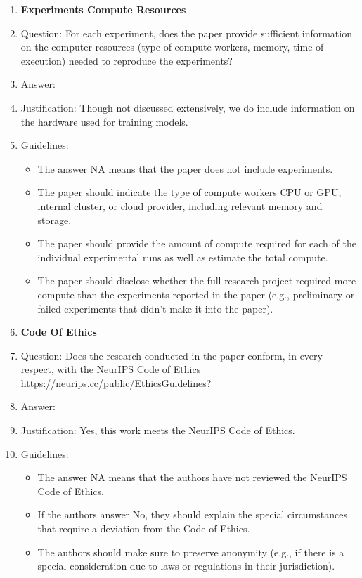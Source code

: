 \documentclass{article}
\begin{document}
\begin{enumerate}
\item {\bf Experiments Compute Resources}
    \item[] Question: For each experiment, does the paper provide sufficient information on the computer resources (type of compute workers, memory, time of execution) needed to reproduce the experiments?
    \item[] Answer: \answerYes{} %
    \item[] Justification: Though not discussed extensively, we do include information on the hardware used for training models.
    \item[] Guidelines:
    \begin{itemize}
        \item The answer NA means that the paper does not include experiments.
        \item The paper should indicate the type of compute workers CPU or GPU, internal cluster, or cloud provider, including relevant memory and storage.
        \item The paper should provide the amount of compute required for each of the individual experimental runs as well as estimate the total compute. 
        \item The paper should disclose whether the full research project required more compute than the experiments reported in the paper (e.g., preliminary or failed experiments that didn't make it into the paper). 
    \end{itemize}
    
\item {\bf Code Of Ethics}
    \item[] Question: Does the research conducted in the paper conform, in every respect, with the NeurIPS Code of Ethics \url{https://neurips.cc/public/EthicsGuidelines}?
    \item[] Answer: \answerYes{} %
    \item[] Justification: Yes, this work meets the NeurIPS Code of Ethics.
    \item[] Guidelines:
    \begin{itemize}
        \item The answer NA means that the authors have not reviewed the NeurIPS Code of Ethics.
        \item If the authors answer No, they should explain the special circumstances that require a deviation from the Code of Ethics.
        \item The authors should make sure to preserve anonymity (e.g., if there is a special consideration due to laws or regulations in their jurisdiction).
    \end{itemize}



\end{enumerate}
\end{document}
